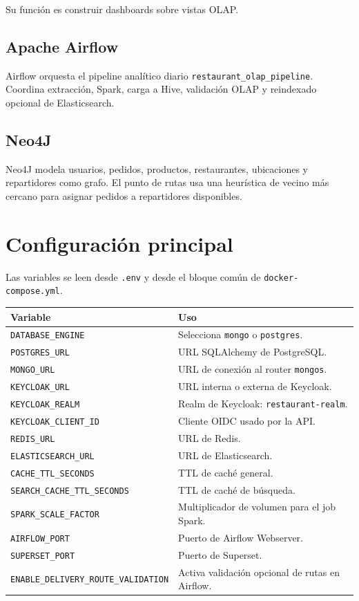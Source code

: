 \documentclass[12pt,letterpaper]{article}
\def\codefile#1{\nolinkurl{#1}}
\begin{document}
Su función es construir dashboards sobre vistas OLAP.

\subsection{Apache Airflow}

Airflow orquesta el pipeline analítico diario \codefile{restaurant\_olap\_pipeline}. Coordina extracción, Spark, carga a Hive, validación OLAP y reindexado opcional de Elasticsearch.

\subsection{Neo4J}

Neo4J modela usuarios, pedidos, productos, restaurantes, ubicaciones y repartidores como grafo. El punto de rutas usa una heurística de vecino más cercano para asignar pedidos a repartidores disponibles.

\section{Configuración principal}

Las variables se leen desde \codefile{.env} y desde el bloque común de \codefile{docker-compose.yml}.

\begin{longtable}{p{}p{}}
\toprule
\textbf{Variable} & \textbf{Uso}\\
\midrule
\codefile{DATABASE\_ENGINE} & Selecciona \codefile{mongo} o \codefile{postgres}.\\
\codefile{POSTGRES\_URL} & URL SQLAlchemy de PostgreSQL.\\
\codefile{MONGO\_URL} & URL de conexión al router \codefile{mongos}.\\
\codefile{KEYCLOAK\_URL} & URL interna o externa de Keycloak.\\
\codefile{KEYCLOAK\_REALM} & Realm de Keycloak: \codefile{restaurant-realm}.\\
\codefile{KEYCLOAK\_CLIENT\_ID} & Cliente OIDC usado por la API.\\
\codefile{REDIS\_URL} & URL de Redis.\\
\codefile{ELASTICSEARCH\_URL} & URL de Elasticsearch.\\
\codefile{CACHE\_TTL\_SECONDS} & TTL de caché general.\\
\codefile{SEARCH\_CACHE\_TTL\_SECONDS} & TTL de caché de búsqueda.\\
\codefile{SPARK\_SCALE\_FACTOR} & Multiplicador de volumen para el job Spark.\\
\codefile{AIRFLOW\_PORT} & Puerto de Airflow Webserver.\\
\codefile{SUPERSET\_PORT} & Puerto de Superset.\\
\codefile{ENABLE\_DELIVERY\_ROUTE\_VALIDATION} & Activa validación opcional de rutas en Airflow.\\
\bottomrule
\end{longtable}
\end{document}
